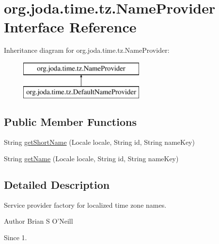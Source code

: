 \hypertarget{interfaceorg_1_1joda_1_1time_1_1tz_1_1_name_provider}{\section{org.\-joda.\-time.\-tz.\-Name\-Provider Interface Reference}
\label{interfaceorg_1_1joda_1_1time_1_1tz_1_1_name_provider}
}
Inheritance diagram for org.\-joda.\-time.\-tz.\-Name\-Provider\-:\begin{figure}[H]
\begin{center}
\leavevmode
\includegraphics[height=2.000000cm]{interfaceorg_1_1joda_1_1time_1_1tz_1_1_name_provider}
\end{center}
\end{figure}
\subsection*{Public Member Functions}
\begin{DoxyCompactItemize}
\item 
String \hyperlink{interfaceorg_1_1joda_1_1time_1_1tz_1_1_name_provider_a65fc5c05e17da9c67d5b447494463599}{get\-Short\-Name} (Locale locale, String id, String name\-Key)
\item 
String \hyperlink{interfaceorg_1_1joda_1_1time_1_1tz_1_1_name_provider_a001ec88ac6a0b01362c286fa80d76f37}{get\-Name} (Locale locale, String id, String name\-Key)
\end{DoxyCompactItemize}


\subsection{Detailed Description}
Service provider factory for localized time zone names.

\begin{DoxyAuthor}{Author}
Brian S O'Neill 
\end{DoxyAuthor}
\begin{DoxySince}{Since}
1. 
\end{DoxySince}


